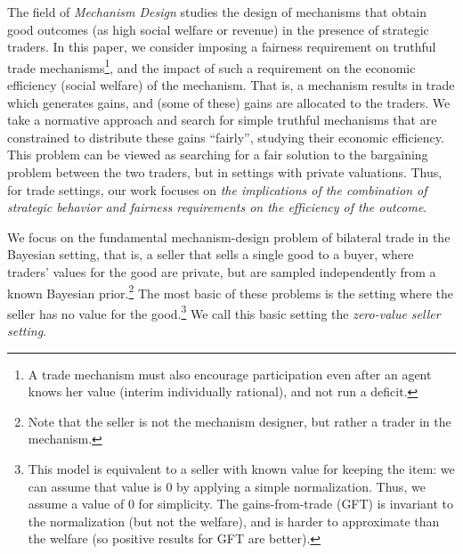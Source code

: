 The field of \emph{Mechanism Design} studies the design of mechanisms that obtain good outcomes (as high social welfare or revenue) in the presence of strategic traders. In this paper, we consider imposing a fairness requirement on truthful trade mechanisms\footnote{A trade mechanism must also encourage participation even after an agent knows her value (interim individually rational), and not run a deficit.}, and the impact of such a requirement on the economic efficiency (social welfare) of the mechanism.  That is, a mechanism results in trade which generates gains, and (some of these) gains are allocated to the traders. We take a normative approach and search for simple truthful mechanisms that are constrained to distribute these gains ``fairly'', 
studying their economic efficiency. This problem can be viewed as searching for a fair solution to the bargaining problem between the two traders, but in settings with private valuations. Thus, for trade settings, our work focuses on \emph{the implications of the combination of strategic behavior and fairness requirements on the efficiency of the outcome}. 


We focus on the fundamental mechanism-design problem of bilateral trade in the Bayesian setting, that is, a seller that sells a single good to a buyer, where traders' values for the good are private, but are sampled independently from a known Bayesian prior.\footnote{Note that the seller is not the mechanism designer, but rather a trader in the mechanism.} The most basic of these problems is the setting where the seller has no value for the good.\footnote{This model is equivalent to a seller with known value for keeping the item: we can assume that value is $0$ by applying a simple normalization. Thus, we assume a value of $0$ for simplicity. The gains-from-trade (GFT) is invariant to the normalization (but not the welfare), and is harder to approximate than the welfare (so positive results for GFT are better).} We call this basic setting the \emph{zero-value seller setting}.

